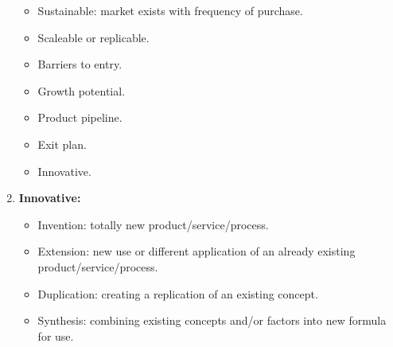 \documentclass[a4paper,11pt]{article}
\begin{document}
\begin{enumerate}
\begin{itemize}
                \item   Sustainable: market exists with frequency of purchase.
                \item   Scaleable or replicable.
                \item   Barriers to entry.
                \item   Growth potential.
                \item   Product pipeline.
                \item   Exit plan.
                \item   Innovative.
            \end{itemize}
    \item   \textbf{Innovative:}
            \begin{itemize}
                \item   Invention: totally new product/service/process.
                \item   Extension: new use or different application of an already existing product/service/process.
                \item   Duplication: creating a replication of an existing concept.
                \item   Synthesis: combining existing concepts and/or factors into new formula for use.
            \end{itemize}
\end{enumerate}
\end{document}
